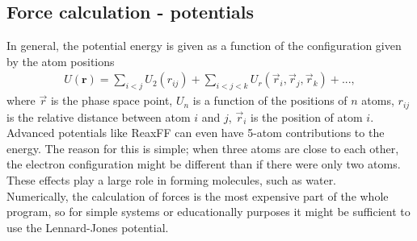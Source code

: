 \subsection{Force calculation - potentials}
In general, the potential energy is given as a function of the configuration given by the atom positions
\begin{align}
	U(\textbf{r}) = \sum_{i<j}U_2(r_{ij}) + \sum_{i<j<k} U_r(\vec r_i, \vec r_j, \vec r_k) + ...,
\end{align}
where $\vec r$ is the phase space point, $U_n$ is a function of the positions of $n$ atoms, $r_{ij}$ is the relative distance between atom $i$ and $j$, $\vec r_i$ is the position of atom $i$. Advanced potentials like ReaxFF can even have 5-atom contributions to the energy\cite{van2001reaxff}. The reason for this is simple; when three atoms are close to each other, the electron configuration might be different than if there were only two atoms. These effects play a large role in forming molecules, such as water.\\
Numerically, the calculation of forces is the most expensive part of the whole program, so for simple systems or educationally purposes it might be sufficient to use the Lennard-Jones potential.

